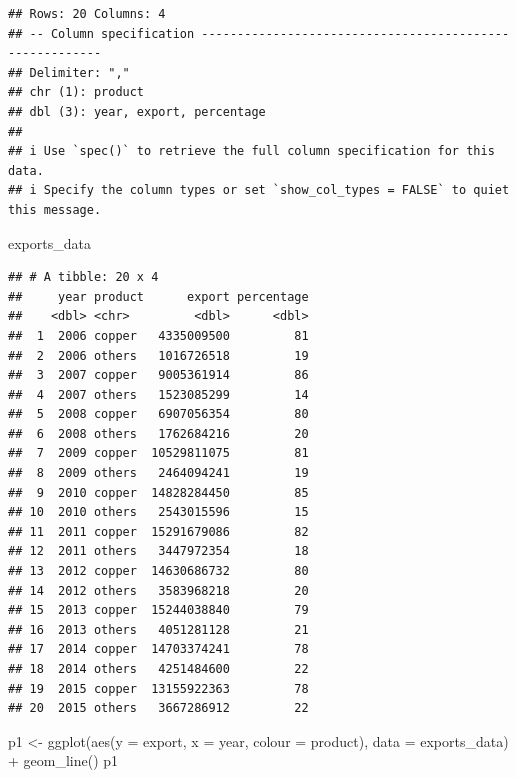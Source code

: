\documentclass[
]{article}
\newenvironment{Shaded}{\begin{snugshade}}{\end{snugshade}}
\newcommand{\AttributeTok}[1]{\textcolor[rgb]{0.77,0.63,0.00}{#1}}
\newcommand{\FunctionTok}[1]{\textcolor[rgb]{0.00,0.00,0.00}{#1}}
\newcommand{\NormalTok}[1]{#1}
\newcommand{\OtherTok}[1]{\textcolor[rgb]{0.56,0.35,0.01}{#1}}
\newcommand{\SpecialCharTok}[1]{\textcolor[rgb]{0.00,0.00,0.00}{#1}}
\begin{document}
\begin{verbatim}
## Rows: 20 Columns: 4
## -- Column specification --------------------------------------------------------
## Delimiter: ","
## chr (1): product
## dbl (3): year, export, percentage
## 
## i Use `spec()` to retrieve the full column specification for this data.
## i Specify the column types or set `show_col_types = FALSE` to quiet this message.
\end{verbatim}

\begin{Shaded}
\begin{Highlighting}[]
\NormalTok{exports\_data}
\end{Highlighting}
\end{Shaded}

\begin{verbatim}
## # A tibble: 20 x 4
##     year product      export percentage
##    <dbl> <chr>         <dbl>      <dbl>
##  1  2006 copper   4335009500         81
##  2  2006 others   1016726518         19
##  3  2007 copper   9005361914         86
##  4  2007 others   1523085299         14
##  5  2008 copper   6907056354         80
##  6  2008 others   1762684216         20
##  7  2009 copper  10529811075         81
##  8  2009 others   2464094241         19
##  9  2010 copper  14828284450         85
## 10  2010 others   2543015596         15
## 11  2011 copper  15291679086         82
## 12  2011 others   3447972354         18
## 13  2012 copper  14630686732         80
## 14  2012 others   3583968218         20
## 15  2013 copper  15244038840         79
## 16  2013 others   4051281128         21
## 17  2014 copper  14703374241         78
## 18  2014 others   4251484600         22
## 19  2015 copper  13155922363         78
## 20  2015 others   3667286912         22
\end{verbatim}

\begin{Shaded}
\begin{Highlighting}[]
\NormalTok{p1 }\OtherTok{\textless{}{-}} \FunctionTok{ggplot}\NormalTok{(}\FunctionTok{aes}\NormalTok{(}\AttributeTok{y =}\NormalTok{ export, }\AttributeTok{x =}\NormalTok{ year, }\AttributeTok{colour =}\NormalTok{ product), }\AttributeTok{data =}\NormalTok{ exports\_data) }\SpecialCharTok{+}
\FunctionTok{geom\_line}\NormalTok{()}
\NormalTok{p1}
\end{Highlighting}
\end{Shaded}
\end{document}

